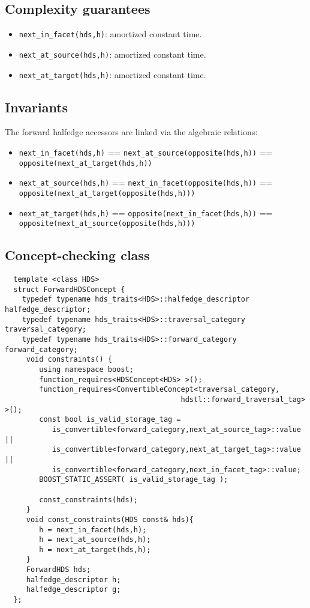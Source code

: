 \subsection{Complexity guarantees}\label{forwardhds_refforwardhds8}
\begin{itemize}
\item {\tt next\_\-in\_\-facet(hds,h)}: amortized constant time.\item {\tt next\_\-at\_\-source(hds,h)}: amortized constant time.\item {\tt next\_\-at\_\-target(hds,h)}: amortized constant time.\end{itemize}
\subsection{Invariants}\label{forwardhds_refforwardhds9}
The forward halfedge accessors are linked via the algebraic relations:\begin{itemize}
\item {\tt next\_\-in\_\-facet(hds,h)} == {\tt next\_\-at\_\-source(opposite(hds,h))} == {\tt opposite(next\_\-at\_\-target(hds,h))}\item {\tt next\_\-at\_\-source(hds,h)} == {\tt next\_\-in\_\-facet(opposite(hds,h))} == {\tt opposite(next\_\-at\_\-target(opposite(hds,h)))}\item {\tt next\_\-at\_\-target(hds,h)} == {\tt opposite(next\_\-in\_\-facet(hds,h))} == {\tt opposite(next\_\-at\_\-source(opposite(hds,h)))}\end{itemize}
\subsection{Concept-checking class}\label{forwardhds_refforwardhds10}


\begin{Code}\begin{verbatim}  template <class HDS> 
  struct ForwardHDSConcept {
    typedef typename hds_traits<HDS>::halfedge_descriptor halfedge_descriptor; 
    typedef typename hds_traits<HDS>::traversal_category traversal_category;
    typedef typename hds_traits<HDS>::forward_category forward_category;
     void constraints() {
        using namespace boost;
        function_requires<HDSConcept<HDS> >();
        function_requires<ConvertibleConcept<traversal_category,
                                         hdstl::forward_traversal_tag> >();  
        const bool is_valid_storage_tag =
           is_convertible<forward_category,next_at_source_tag>::value ||
           is_convertible<forward_category,next_at_target_tag>::value ||
           is_convertible<forward_category,next_in_facet_tag>::value;
        BOOST_STATIC_ASSERT( is_valid_storage_tag ); 
 
        const_constraints(hds);
     }
     void const_constraints(HDS const& hds){
        h = next_in_facet(hds,h);
        h = next_at_source(hds,h);
        h = next_at_target(hds,h);
     }
     ForwardHDS hds;
     halfedge_descriptor h;
     halfedge_descriptor g;
  };
\end{verbatim}\end{Code}

 